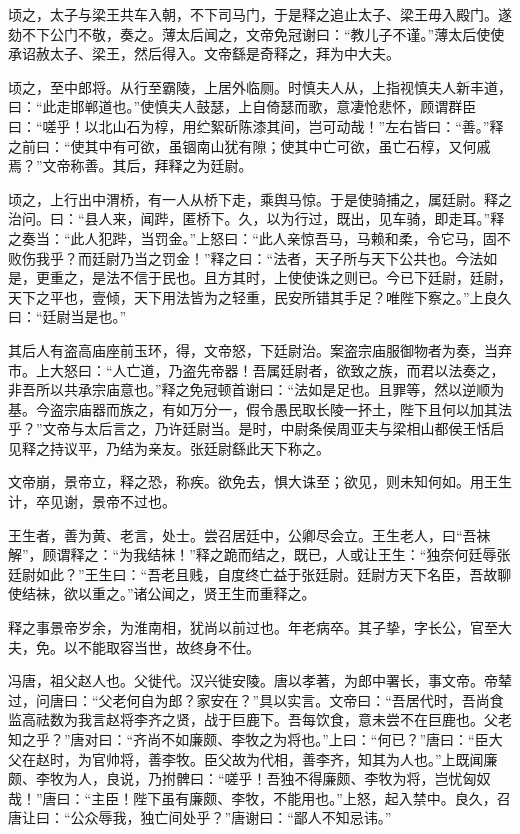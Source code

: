\documentclass[]{article}
\begin{document}
顷之，太子与梁王共车入朝，不下司马门，于是释之追止太子、梁王毋入殿门。遂劾不下公门不敬，奏之。薄太后闻之，文帝免冠谢曰：``教儿子不谨。''薄太后使使承诏赦太子、梁王，然后得入。文帝繇是奇释之，拜为中大夫。

顷之，至中郎将。从行至霸陵，上居外临厕。时慎夫人从，上指视慎夫人新丰道，曰：``此走邯郸道也。''使慎夫人鼓瑟，上自倚瑟而歌，意凄怆悲怀，顾谓群臣曰：``嗟乎！以北山石为椁，用纻絮斫陈漆其间，岂可动哉！''左右皆曰：``善。''释之前曰：``使其中有可欲，虽锢南山犹有隙；使其中亡可欲，虽亡石椁，又何戚焉？''文帝称善。其后，拜释之为廷尉。

顷之，上行出中渭桥，有一人从桥下走，乘舆马惊。于是使骑捕之，属廷尉。释之治问。曰：``县人来，闻跸，匿桥下。久，以为行过，既出，见车骑，即走耳。''释之奏当：``此人犯跸，当罚金。''上怒曰：``此人亲惊吾马，马赖和柔，令它马，固不败伤我乎？而廷尉乃当之罚金！''释之曰：``法者，天子所与天下公共也。今法如是，更重之，是法不信于民也。且方其时，上使使诛之则已。今已下廷尉，廷尉，天下之平也，壹倾，天下用法皆为之轻重，民安所错其手足？唯陛下察之。''上良久曰：``廷尉当是也。''

其后人有盗高庙座前玉环，得，文帝怒，下廷尉治。案盗宗庙服御物者为奏，当弃市。上大怒曰：``人亡道，乃盗先帝器！吾属廷尉者，欲致之族，而君以法奏之，非吾所以共承宗庙意也。''释之免冠顿首谢曰：``法如是足也。且罪等，然以逆顺为基。今盗宗庙器而族之，有如万分一，假令愚民取长陵一抔土，陛下且何以加其法乎？''文帝与太后言之，乃许廷尉当。是时，中尉条侯周亚夫与梁相山都侯王恬启见释之持议平，乃结为亲友。张廷尉繇此天下称之。

文帝崩，景帝立，释之恐，称疾。欲免去，惧大诛至；欲见，则未知何如。用王生计，卒见谢，景帝不过也。

王生者，善为黄、老言，处士。尝召居廷中，公卿尽会立。王生老人，曰``吾袜解''，顾谓释之：``为我结袜！''释之跪而结之，既已，人或让王生：``独奈何廷辱张廷尉如此？''王生曰：``吾老且贱，自度终亡益于张廷尉。廷尉方天下名臣，吾故聊使结袜，欲以重之。''诸公闻之，贤王生而重释之。

释之事景帝岁余，为淮南相，犹尚以前过也。年老病卒。其子挚，字长公，官至大夫，免。以不能取容当世，故终身不仕。

冯唐，祖父赵人也。父徙代。汉兴徙安陵。唐以孝著，为郎中署长，事文帝。帝辇过，问唐曰：``父老何自为郎？家安在？''具以实言。文帝曰：``吾居代时，吾尚食监高祛数为我言赵将李齐之贤，战于巨鹿下。吾每饮食，意未尝不在巨鹿也。父老知之乎？''唐对曰：``齐尚不如廉颇、李牧之为将也。''上曰：``何已？''唐曰：``臣大父在赵时，为官帅将，善李牧。臣父故为代相，善李齐，知其为人也。''上既闻廉颇、李牧为人，良说，乃拊髀曰：``嗟乎！吾独不得廉颇、李牧为将，岂忧匈奴哉！''唐曰：``主臣！陛下虽有廉颇、李牧，不能用也。''上怒，起入禁中。良久，召唐让曰：``公众辱我，独亡间处乎？''唐谢曰：``鄙人不知忌讳。''
\end{document}
